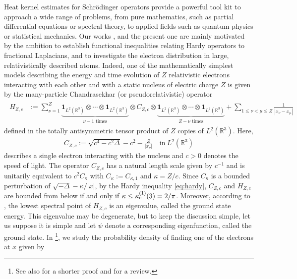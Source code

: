 \documentclass[12pt,reqno]{amsart}
\theoremstyle{definition}
\theoremstyle{remark}
\numberwithin{equation}{section}
\newcommand{\1}{\mathbbm{1}}
\newcommand{\R}{\mathbb{R}}
\newcommand{\one}{\mathbf{1}}
\begin{document}
Heat kernel estimates for Schr\"odinger operators provide a powerful tool kit to approach a wide range of problems, from pure mathematics, such as partial differential equations or spectral theory, to applied fields such as quantum physics or statistical mechanics.
Our works \cite{BogdanMerz2024,BogdanMerz2025,Bogdanetal2024}, and the present one are mainly motivated by the ambition to establish functional inequalities relating Hardy operators to fractional Laplacians, and to investigate the electron distribution in large, relativistically described atoms. Indeed, one of the mathematically simplest models describing the energy and time evolution of $Z$ relativistic electrons interacting with each other and with a static nucleus of electric charge $Z$ is given by the many-particle Chandrasekhar (or pseudorelativistic) operator
\begin{align}
  \label{eq:manyparticlechandrasekhar}
  \begin{split}
    H_{Z,c}
    & := \sum_{\nu=1}^Z \underbrace{\one_{L^2(\R^3)}\otimes\cdots\otimes\one_{L^2(\R^3)}}_{\nu-1\text{ times}} \otimes C_{Z,c} \otimes \underbrace{\one_{L^2(\R^3)}\otimes\cdots\otimes \one_{L^2(\R^3)}}_{Z-\nu\text{ times}} + \sum_{1\leq\nu<\mu\leq Z}\frac{1}{|x_\nu-x_\mu|}
  \end{split}
\end{align}
defined in the totally antisymmetric tensor product of $Z$ copies of $L^2(\R^3)$. Here,
\begin{align}
  \label{eq:chandrasekhar}
  C_{Z,c} := \sqrt{c^4-c^2\Delta}-c^2-\frac{Z}{|x_\nu|} \quad \text{in} \ L^2(\R^3)
\end{align}
describes a single electron interacting with the nucleus and $c>0$ denotes the speed of light. The operator $C_{Z,c}$ has a natural length scale given by $c^{-1}$ and is unitarily equivalent to $c^2C_\kappa$ with $C_\kappa:=C_{\kappa,1}$ and $\kappa=Z/c$. Since $C_\kappa$ is a bounded perturbation of $\sqrt{-\Delta}-\kappa/|x|$, by the Hardy inequality \eqref{eq:hardy}, $C_{Z,c}$ and $H_{Z,c}$ are bounded from below if and only if $\kappa\leq\kappa_{\rm c}^{(1)}(3)=2/\pi$. Moreover, according to \cite{Lewisetal1997}, the lowest spectral point of $H_{Z,c}$ is an eigenvalue, called the ground state energy. This eigenvalue may be degenerate, but to keep the discussion simple, let us suppose it is simple and let $\psi$ denote a corresponding eigenfunction, called the ground state. In \cite{Franketal2020P}\footnote{See also \cite{Franketal2023} for a shorter proof and \cite{Franketal2023T} for a review.}, we study the probability density of finding one of the electrons at $x$ given by
\end{document}
